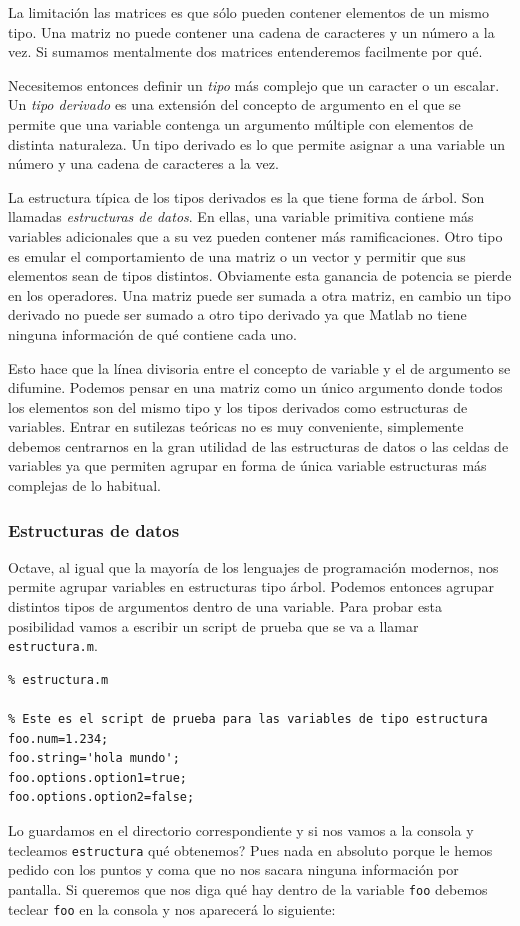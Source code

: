 La limitación las matrices es que sólo pueden contener
elementos de un mismo tipo.  Una matriz no puede contener una cadena
de caracteres y un número a la vez.  Si sumamos mentalmente dos
matrices entenderemos facilmente por qué.

Necesitemos entonces definir un \emph{tipo}
más complejo que un caracter o un escalar.  Un \emph{tipo derivado
}
es una extensión del concepto de argumento en el que se permite que una
variable contenga un argumento múltiple con elementos de distinta
naturaleza.  Un tipo derivado es lo que permite asignar a una variable
un número y una cadena de caracteres a la vez.

La estructura típica de los tipos derivados es la que tiene forma
de árbol.  Son llamadas \emph{estructuras de datos}.  En ellas, una
variable primitiva contiene más variables adicionales que a su vez
pueden contener más ramificaciones. Otro tipo es emular el comportamiento
de una matriz o un vector y permitir que sus elementos sean de tipos
distintos.  Obviamente esta ganancia de potencia se pierde en los
operadores.  Una matriz puede ser sumada a otra matriz, en cambio un
tipo derivado no puede ser sumado a otro tipo derivado ya que Matlab
no tiene ninguna información de qué contiene cada uno.

Esto hace que la línea divisoria entre el concepto de variable y
el de argumento se difumine.  Podemos pensar en una matriz como
un único argumento donde todos los elementos son del mismo tipo
y los tipos derivados como estructuras de variables.  Entrar en 
sutilezas teóricas no es muy conveniente, simplemente debemos
centrarnos en la gran utilidad de las estructuras de datos o las
celdas de variables ya que permiten agrupar en forma de única
variable estructuras más complejas de lo habitual.


\subsubsection{Estructuras de datos}

Octave, al igual que la mayoría de los lenguajes de programación
modernos, nos permite agrupar variables en estructuras tipo árbol.
Podemos entonces agrupar distintos tipos de argumentos dentro de una
variable. Para probar esta posibilidad vamos a escribir un script de
prueba que se va a llamar \texttt{estructura.m}.

\begin{lstlisting}
% estructura.m

% Este es el script de prueba para las variables de tipo estructura
foo.num=1.234;   
foo.string='hola mundo';   
foo.options.option1=true;   
foo.options.option2=false;
\end{lstlisting}
Lo guardamos en el directorio correspondiente y si nos vamos a la
consola y tecleamos \texttt{estructura} qué obtenemos? Pues nada en
absoluto porque le hemos pedido con los puntos y coma que no nos
sacara ninguna información por pantalla. Si queremos que nos diga qué
hay dentro de la variable \texttt{foo} debemos teclear \texttt{foo} en
la consola y nos aparecerá lo siguiente:

